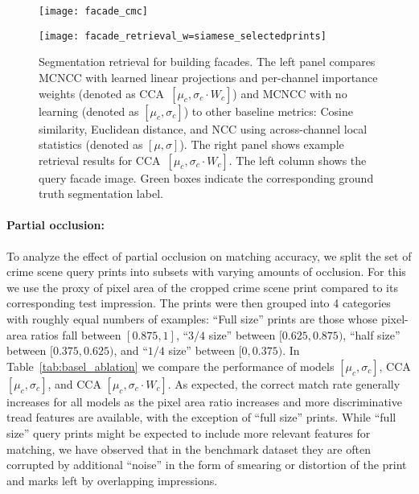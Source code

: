 \documentclass[twocolumn]{svjour3}           %
\begin{document}
\begin{figure*}[t]
\begin{center}
\begin{minipage}{0.45\textwidth}
  \texttt{[image: facade\_cmc]}
\end{minipage}
\begin{minipage}{0.5\textwidth}
  \flushright
  \texttt{[image: facade\_retrieval\_w=siamese\_selectedprints]}
\end{minipage}
\end{center}
\caption{Segmentation retrieval for building facades. The left panel compares
  MCNCC with learned linear projections and per-channel importance weights
  (denoted as CCA~$[\mu_c,\sigma_c\cdot W_c]$) and MCNCC with no learning
  (denoted as $[\mu_c,\sigma_c]$) to other baseline metrics: Cosine
  similarity, Euclidean distance, and NCC using across-channel local
  statistics (denoted as $[\mu,\sigma]$). The right panel shows example
  retrieval results for CCA~$[\mu_c,\sigma_c\cdot W_c]$. The left column shows
  the query facade image. Green boxes indicate the corresponding ground truth
  segmentation label.}
\label{fig:facade_retrieval}
\end{figure*}

\paragraph{Partial occlusion:}
To analyze the effect of partial occlusion on matching accuracy, we split the
set of crime scene query prints into subsets with varying amounts of occlusion.
For this we use the proxy of pixel area of the cropped crime scene print
compared to its corresponding test impression. The prints were then grouped
into 4 categories with roughly equal numbers of examples: ``Full size'' prints
are those whose pixel-area ratios fall between $[0.875, 1]$, ``$3/4$ size''
between $[0.625, 0.875)$, ``half size'' between $[0.375, 0.625)$, and ``$1/4$
size'' between $[0, 0.375)$.  In Table~\ref{tab:basel_ablation} we compare the
performance of models $[\mu_c,\sigma_c]$, CCA $[\mu_c,\sigma_c]$, and CCA
$[\mu_c,\sigma_c\cdot W_c]$. As expected, the correct match rate generally
increases for all models as the pixel area ratio increases and more
discriminative tread features are available, with the exception of ``full
size'' prints.  While ``full size'' query prints might be expected to include
more relevant features for matching, we have observed that in the benchmark
dataset they are often corrupted by additional ``noise'' in the form of
smearing or distortion of the print and marks left by overlapping impressions.
\end{document}

